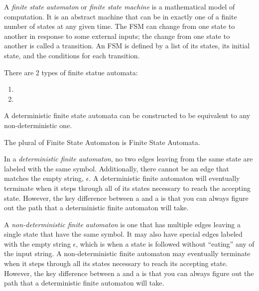 \begin{definition}\label{def:Finite State Automaton}
  A \emph{finite state automaton} or \emph{finite state machine} is a mathematical model of computation.
  It is an abstract machine that can be in exactly one of a finite number of states at any given time.
  The FSM can change from one state to another in response to some external inputs; the change from one state to another is called a transition.
  An FSM is defined by a list of its states, its initial state, and the conditions for each transition.

  There are 2 types of finite statue automata:
  \begin{enumerate}
  \item {}
  \item {}
  \end{enumerate}

  A deterministic finite state automata can be constructed to be equivalent to any non-deterministic one.

  \begin{remark}
    The plural of Finite State Automaton is Finite State Automata.
  \end{remark}
\end{definition}

\begin{definition}\label{def:DeterministicFiniteAutomataDFA}
  In a \emph{deterministic finite automaton}, no two edges leaving from the same state are labeled with the same symbol.
  Additionally, there cannot be an edge that matches the empty string, $\epsilon$.
  A deterministic finite automaton will eventually terminate when it steps through all of its states necessary to reach the accepting state.
  However, the key difference between a  and a  is that you can always figure out the path that a deterministic finite automaton will take.
\end{definition}

\begin{definition}\label{def:Non-deterministicFiniteAutomataNFA}
  A \emph{non-deterministic finite automaton} is one that has multiple edges leaving a single state that have the same symbol.
  It may also have special edges labeled with the empty string $\epsilon$, which is when a state is followed without ``eating'' any of the input string.
  A non-deterministic finite automaton may eventually terminate when it steps through all its states necessary to reach its accepting state.
  However, the key difference between a  and a  is that you can always figure out the path that a deterministic finite automaton will take.
\end{definition}

